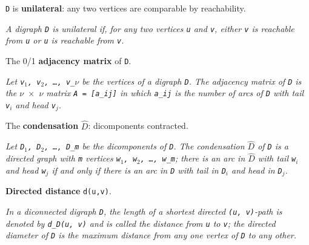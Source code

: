 \begin{definition}
\label{Digraph.IsUnilateral}
\leanok
{}
\texttt{D} is \textbf{unilateral}: any two vertices are comparable by reachability.

\emph{A digraph \texttt{D} is unilateral
if, for any two vertices \texttt{u} and \texttt{v}, either \texttt{v} is reachable from
\texttt{u} or \texttt{u} is
reachable from \texttt{v}.}
\end{definition}

\begin{definition}
\label{Digraph.adjMatrix}
\leanok
The 0/1 \textbf{adjacency matrix} of \texttt{D}.

\emph{Let \texttt{v$_{1}$, v$_{2}$, \dots{}, v\_$\nu$} be the
vertices of a digraph \texttt{D}. The adjacency matrix of \texttt{D} is the
\texttt{$\nu$ $\times$ $\nu$} matrix
\texttt{A = [a\_ij]} in which \texttt{a\_ij} is the number of arcs of \texttt{D} with tail \texttt{v$_{i}$} and head
\texttt{v$_{j}$}.}
\end{definition}

\begin{definition}
\label{Digraph.condensation}
\leanok
{}
The \textbf{condensation} \texttt{$\hat{D}$}: dicomponents contracted.

\emph{Let \texttt{D$_{1}$, D$_{2}$, \dots{}, D\_m} be the
dicomponents of \texttt{D}. The condensation \texttt{$\hat{D}$} of \texttt{D} is a
directed graph with \texttt{m}
vertices \texttt{w$_{1}$, w$_{2}$, \dots{}, w\_m}; there is an arc in \texttt{$\hat{D}$}
with tail \texttt{w$_{i}$} and head \texttt{w$_{j}$} if
and only if there is an arc in \texttt{D} with tail in \texttt{D$_{i}$} and head in
\texttt{D$_{j}$}.}
\end{definition}

\begin{definition}[dirDist]
\label{Digraph.dirDist}
\leanok
{}
\textbf{Directed distance} \texttt{d(u,v)}.

\emph{In a diconnected digraph \texttt{D}, the
length of a shortest directed \texttt{(u, v)}-path is denoted by \texttt{d\_D(u, v)} and
is called
the distance from \texttt{u} to \texttt{v}; the directed diameter of \texttt{D} is the
maximum distance
from any one vertex of \texttt{D} to any other.}
\end{definition}


